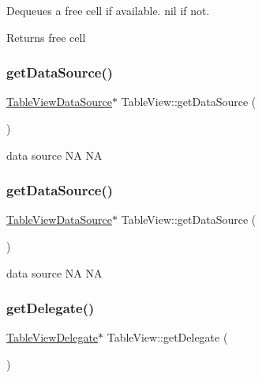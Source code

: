 Dequeues a free cell if available. nil if not.

\begin{DoxyReturn}{Returns}
free cell 
\end{DoxyReturn}
\mbox{\label{classTableView_aca51ba7a0f81e6e3c80056733665cd5a}} 
\subsubsection{\texorpdfstring{get\+Data\+Source()}{getDataSource()}\hspace{0.1cm}{\footnotesize\ttfamily [1/2]}}
{\footnotesize\ttfamily \hyperlink{classTableViewDataSource}{Table\+View\+Data\+Source}$\ast$ Table\+View\+::get\+Data\+Source (\begin{DoxyParamCaption}{ }\end{DoxyParamCaption})\hspace{0.3cm}{\ttfamily [inline]}}

data source  NA  NA \mbox{\label{classTableView_aca51ba7a0f81e6e3c80056733665cd5a}} 
\subsubsection{\texorpdfstring{get\+Data\+Source()}{getDataSource()}\hspace{0.1cm}{\footnotesize\ttfamily [2/2]}}
{\footnotesize\ttfamily \hyperlink{classTableViewDataSource}{Table\+View\+Data\+Source}$\ast$ Table\+View\+::get\+Data\+Source (\begin{DoxyParamCaption}{ }\end{DoxyParamCaption})\hspace{0.3cm}{\ttfamily [inline]}}

data source  NA  NA \mbox{\label{classTableView_a1530f5f201ca31501a85e27a3b45453f}} 
\subsubsection{\texorpdfstring{get\+Delegate()}{getDelegate()}\hspace{0.1cm}{\footnotesize\ttfamily [1/2]}}
{\footnotesize\ttfamily \hyperlink{classTableViewDelegate}{Table\+View\+Delegate}$\ast$ Table\+View\+::get\+Delegate (\begin{DoxyParamCaption}{ }\end{DoxyParamCaption})\hspace{0.3cm}{\ttfamily [inline]}}

